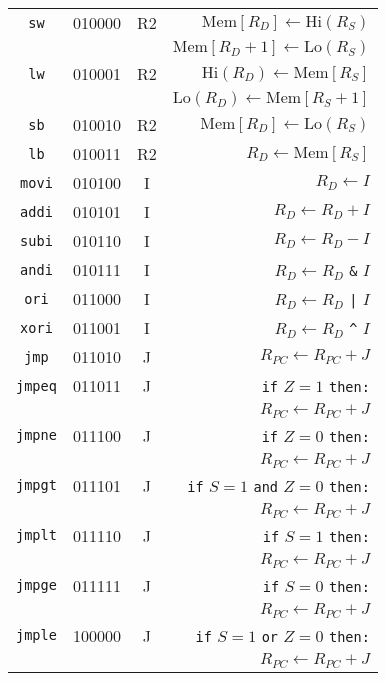 \documentclass[12pt]{scrartcl}
\begin{document}
\begin{center}
\begin{longtable}{c c c r}
    \texttt{sw}   & 010000 & R2 & $\mathrm{Mem}[R_D] \gets \mathrm{Hi}(R_S)$ \\
    & & &                         $\mathrm{Mem}[R_D+1] \gets \mathrm{Lo}(R_S)$ \\
    \texttt{lw}   & 010001 & R2 & $\mathrm{Hi}(R_D) \gets \mathrm{Mem}[R_S]$ \\
    & & &                         $\mathrm{Lo}(R_D) \gets \mathrm{Mem}[R_S+1]$ \\
    \texttt{sb}   & 010010 & R2 & $\mathrm{Mem}[R_D] \gets \mathrm{Lo}(R_S)$ \\
    \texttt{lb}   & 010011 & R2 & $R_D \gets \mathrm{Mem}[R_S]$ \\
    \texttt{movi} & 010100 & I  & $R_D \gets I$ \\
    \texttt{addi} & 010101 & I  & $R_D \gets R_D + I$ \\
    \texttt{subi} & 010110 & I  & $R_D \gets R_D - I$ \\
    \texttt{andi} & 010111 & I  & $R_D \gets R_D$ \texttt{\&} $I$ \\
    \texttt{ori}  & 011000 & I  & $R_D \gets R_D$ \texttt{|} $I$ \\
    \texttt{xori} & 011001 & I  & $R_D \gets R_D$ \texttt{\^{}} $I$ \\
    \texttt{jmp}  & 011010 & J  & $R_{PC} \gets R_{PC} + J$ \\
    \texttt{jmpeq}& 011011 & J  & \texttt{if} $Z = 1$ \texttt{then:} \\
    & & &                         $R_{PC} \gets R_{PC} + J$ \\
    \texttt{jmpne}& 011100 & J  & \texttt{if} $Z = 0$ \texttt{then:} \\
    & & &                         $R_{PC} \gets R_{PC} + J$ \\
    \texttt{jmpgt}& 011101 & J  & \texttt{if} $S = 1$ \texttt{and} $Z = 0$ \texttt{then:} \\
    & & &                         $R_{PC} \gets R_{PC} + J$ \\
    \texttt{jmplt}& 011110 & J  & \texttt{if} $S = 1$ \texttt{then:} \\
    & & &                         $R_{PC} \gets R_{PC} + J$ \\
    \texttt{jmpge}& 011111 & J  & \texttt{if} $S = 0$ \texttt{then:} \\
    & & &                         $R_{PC} \gets R_{PC} + J$ \\
    \texttt{jmple}& 100000 & J  & \texttt{if} $S = 1$ \texttt{or} $Z = 0$ \texttt{then:} \\
    & & &                         $R_{PC} \gets R_{PC} + J$ \\
  \end{longtable}
\end{center}
\end{document}
